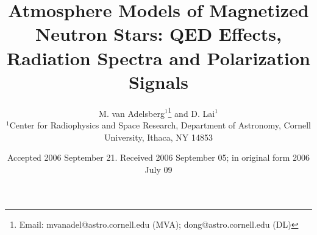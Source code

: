 \documentclass[useAMS,onecolumn,usenatbib,usegraphicx]{mn2e}
\begin{document}
\title[Atmosphere Models of Magnetized Neutron Stars] 
{Atmosphere Models of Magnetized Neutron Stars: QED Effects, Radiation Spectra and Polarization Signals}
\author[M. van Adelsberg and D. Lai] {M. van
Adelsberg$^{1}$\thanks{Email: mvanadel@astro.cornell.edu (MVA);
dong@astro.cornell.edu (DL)} and D. Lai$^{1}$\footnotemark[1]\\
$^{1}$Center for Radiophysics and Space Research, Department of
Astronomy, Cornell University, Ithaca, NY 14853}

\date{Accepted 2006 September 21. Received 2006 September 05; 
in original form 2006 July 09}

\pagerange{\pageref{firstpage}--\pageref{lastpage}} 

\maketitle
\label{firstpage}
\end{document}
